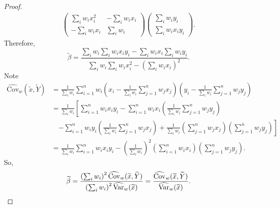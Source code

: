 \documentclass[12pt]{article}
\renewcommand{\(}{\left(}%
\renewcommand{\)}{\right)}%
\renewcommand{\[}{\left[}%
\renewcommand{\]}{\right]}%
\newcommand{\var}{{\rm Var}}
\newtheorem{proof}{Proof.}}
\begin{document}
\begin{proof}
\begin{equation*}
\begin{split}
\begin{pmatrix}
				\sum_iw_ix_i^2 & -\sum_iw_ix_i\\
				-\sum_iw_ix_i & \sum_i w_i
			\end{pmatrix}
			\begin{pmatrix}
				\sum_iw_iy_i\\
				\sum_iw_ix_i y_i
			\end{pmatrix}.
		\end{split}
	\end{equation*}
	Therefore,
	\begin{equation*}
		\widetilde{\beta}=\frac{\sum_i w_i\sum_iw_ix_i y_i-\sum_iw_ix_i\sum_iw_iy_i}{\sum_i w_i\sum_iw_ix_i^2-\(\sum_iw_ix_i\)^2}.
	\end{equation*}
	Note 
	\begin{equation*}
		\begin{split}
			\widehat{\mathrm{Cov}}_w(\widetilde{ x},\widetilde{ Y})&=\frac{1}{\sum_iw_i}\sum_{i=1}^n w_i\(x_i-\frac{1}{\sum_i w_i} \sum_{j=1}^nw_jx_j\)\(y_i-\frac{1}{\sum_i w_i} \sum_{j=1}^nw_jy_j\)\\
			&=\frac{1}{\sum_iw_i}\[\sum_{i=1}^n w_ix_iy_i-\sum_{i=1}^n w_i x_i\(\frac{1}{\sum_i w_i} \sum_{j=1}^nw_jy_j\)\right.\\
			&\quad \left.-\sum_{i=1}^n w_i y_i\(\frac{1}{\sum_i w_i} \sum_{j=1}^nw_jx_j\)+\frac{1}{\sum_i w_i} \(\sum_{j=1}^nw_jx_j\)\(\sum_{j=1}^nw_jy_j\)\]\\
			&=\frac{1}{\sum_iw_i}\sum_{i=1}^n w_ix_iy_i-\(\frac{1}{\sum_i w_i}\)^2\(\sum_{i=1}^n w_i x_i\)\( \sum_{j=1}^nw_jy_j\).
		\end{split}
	\end{equation*}
	So,
	\begin{equation*}
		\widetilde{\beta}=\frac{\(\sum_iw_i\)^2\widehat{\mathrm{Cov}}_w(\widetilde{ x},\widetilde{ Y})}{\(\sum_iw_i\)^2\widehat{\var}_w(\widetilde{ x})}=\frac{\widehat{\mathrm{Cov}}_w(\widetilde{ x},\widetilde{ Y})}{\widehat{\var}_w(\widetilde{ x}) }.
	\end{equation*}
\end{proof}
\end{document}
